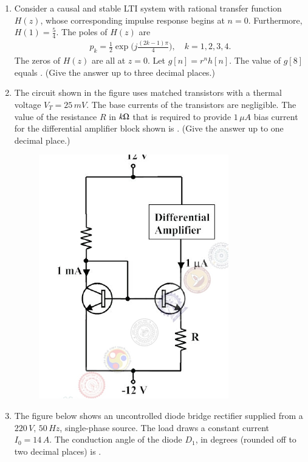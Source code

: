 \documentclass[journal,12pt,onecolumn]{IEEEtran}
\theoremstyle{remark}
\begin{document}
\begin{enumerate}
\item Consider a causal and stable LTI system with rational transfer function \(H(z)\), whose corresponding impulse response begins at \(n=0\). Furthermore, \(H(1) = \frac{5}{4}\).  
The poles of \(H(z)\) are 
\begin{align*}
    p_k = \frac{1}{2} \exp\Big( j \frac{(2k-1)\pi}{4}\Big), \quad k=1,2,3,4.
\end{align*}
The zeros of \(H(z)\) are all at \(z=0\). Let \(g[n] = r^n h[n]\). The value of \(g[8]\) equals \underline{\hspace{2cm}}.  
(Give the answer up to three decimal places.)


\item The circuit shown in the figure uses matched transistors with a thermal voltage \(V_T = 25\, mV\). The base currents of the transistors are negligible. The value of the resistance \(R\) in \(k\ohm\) that is required to provide \(1\, \mu A\) bias current for the differential amplifier block shown is \underline{\hspace{2cm}}.  
(Give the answer up to one decimal place.)  

\begin{figure}[H]
    \centering
    \includegraphics[width=0.5\columnwidth]{figs/52.png}
    \caption{}
    \label{fig:placeholder}
\end{figure}


\item The figure below shows an uncontrolled diode bridge rectifier supplied from a \(220 \, V, \, 50\, Hz\), single-phase source. The load draws a constant current \(I_0 = 14 \, A\). The conduction angle of the diode \(D_1\), in degrees (rounded off to two decimal places) is \underline{\hspace{2cm}}.  


\end{enumerate}
\end{document}
